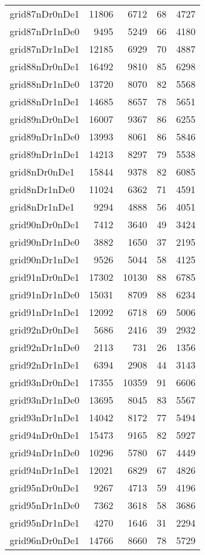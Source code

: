 \begin{longtable}{lrrrr}
grid87nDr0nDe1 & 11806 & 6712 & 68 & 4727 \\
grid87nDr1nDe0 & 9495 & 5249 & 66 & 4180 \\
grid87nDr1nDe1 & 12185 & 6929 & 70 & 4887 \\
grid88nDr0nDe1 & 16492 & 9810 & 85 & 6298 \\
grid88nDr1nDe0 & 13720 & 8070 & 82 & 5568 \\
grid88nDr1nDe1 & 14685 & 8657 & 78 & 5651 \\
grid89nDr0nDe1 & 16007 & 9367 & 86 & 6255 \\
grid89nDr1nDe0 & 13993 & 8061 & 86 & 5846 \\
grid89nDr1nDe1 & 14213 & 8297 & 79 & 5538 \\
grid8nDr0nDe1 & 15844 & 9378 & 82 & 6085 \\
grid8nDr1nDe0 & 11024 & 6362 & 71 & 4591 \\
grid8nDr1nDe1 & 9294 & 4888 & 56 & 4051 \\
grid90nDr0nDe1 & 7412 & 3640 & 49 & 3424 \\
grid90nDr1nDe0 & 3882 & 1650 & 37 & 2195 \\
grid90nDr1nDe1 & 9526 & 5044 & 58 & 4125 \\
grid91nDr0nDe1 & 17302 & 10130 & 88 & 6785 \\
grid91nDr1nDe0 & 15031 & 8709 & 88 & 6234 \\
grid91nDr1nDe1 & 12092 & 6718 & 69 & 5006 \\
grid92nDr0nDe1 & 5686 & 2416 & 39 & 2932 \\
grid92nDr1nDe0 & 2113 & 731 & 26 & 1356 \\
grid92nDr1nDe1 & 6394 & 2908 & 44 & 3143 \\
grid93nDr0nDe1 & 17355 & 10359 & 91 & 6606 \\
grid93nDr1nDe0 & 13695 & 8045 & 83 & 5567 \\
grid93nDr1nDe1 & 14042 & 8172 & 77 & 5494 \\
grid94nDr0nDe1 & 15473 & 9165 & 82 & 5927 \\
grid94nDr1nDe0 & 10296 & 5780 & 67 & 4449 \\
grid94nDr1nDe1 & 12021 & 6829 & 67 & 4826 \\
grid95nDr0nDe1 & 9267 & 4713 & 59 & 4196 \\
grid95nDr1nDe0 & 7362 & 3618 & 58 & 3686 \\
grid95nDr1nDe1 & 4270 & 1646 & 31 & 2294 \\
grid96nDr0nDe1 & 14766 & 8660 & 78 & 5729 \\

\end{longtable}
